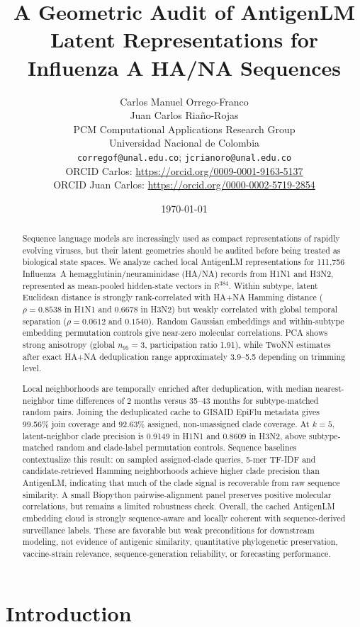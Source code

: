 \documentclass[11pt]{article}
\title{A Geometric Audit of AntigenLM Latent Representations for Influenza A HA/NA Sequences}
\author{
Carlos Manuel Orrego-Franco\\
Juan Carlos Riaño-Rojas\\
\vspace{0.4em}
\small PCM Computational Applications Research Group\\
\small Universidad Nacional de Colombia\\
\small \texttt{corregof@unal.edu.co}; \texttt{jcrianoro@unal.edu.co}\\
\small ORCID Carlos: \url{https://orcid.org/0009-0001-9163-5137}\\
\small ORCID Juan Carlos: \url{https://orcid.org/0000-0002-5719-2854}
}
\date{\today}
\newcommand{\R}{\mathbb{R}}
\begin{document}
\maketitle

\begin{abstract}
Sequence language models are increasingly used as compact representations of rapidly evolving viruses, but their latent geometries should be audited before being treated as biological state spaces. We analyze cached local AntigenLM representations for 111,756 Influenza~A hemagglutinin/neuraminidase (HA/NA) records from H1N1 and H3N2, represented as mean-pooled hidden-state vectors in $\R^{384}$. Within subtype, latent Euclidean distance is strongly rank-correlated with HA+NA Hamming distance ($\rho=0.8538$ in H1N1 and $0.6678$ in H3N2) but weakly correlated with global temporal separation ($\rho=0.0612$ and $0.1540$). Random Gaussian embeddings and within-subtype embedding permutation controls give near-zero molecular correlations. PCA shows strong anisotropy (global $n_{95}=3$, participation ratio 1.91), while TwoNN estimates after exact HA+NA deduplication range approximately 3.9--5.5 depending on trimming level.

Local neighborhoods are temporally enriched after deduplication, with median nearest-neighbor time differences of 2 months versus 35--43 months for subtype-matched random pairs. Joining the deduplicated cache to GISAID EpiFlu metadata gives 99.56\% join coverage and 92.63\% assigned, non-unassigned clade coverage. At $k=5$, latent-neighbor clade precision is 0.9149 in H1N1 and 0.8609 in H3N2, above subtype-matched random and clade-label permutation controls. Sequence baselines contextualize this result: on sampled assigned-clade queries, 5-mer TF-IDF and candidate-retrieved Hamming neighborhoods achieve higher clade precision than AntigenLM, indicating that much of the clade signal is recoverable from raw sequence similarity. A small Biopython pairwise-alignment panel preserves positive molecular correlations, but remains a limited robustness check. Overall, the cached AntigenLM embedding cloud is strongly sequence-aware and locally coherent with sequence-derived surveillance labels. These are favorable but weak preconditions for downstream modeling, not evidence of antigenic similarity, quantitative phylogenetic preservation, vaccine-strain relevance, sequence-generation reliability, or forecasting performance.
\end{abstract}

\section{Introduction}
\end{document}
